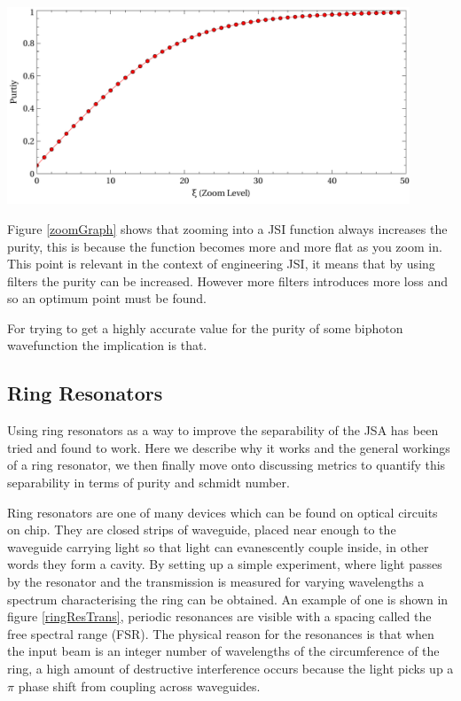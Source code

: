 \begingroup
\centering
    \includegraphics[width=12cm]{res/theory/zoomGraph.pdf}
 \label{zoomGraph}
\endgroup

Figure \ref{zoomGraph} shows that zooming into a JSI function always increases the purity, this is because the function becomes more and more flat as you zoom in. This point is relevant in the context of engineering JSI, it means that by using filters the purity can be increased. However more filters introduces more loss and so an optimum point must be found.

For trying to get a highly accurate value for the purity of some biphoton wavefunction the implication is that. 

\subsection{Ring Resonators} \label{resSect}
Using ring resonators as a way to improve the separability of the JSA has been tried and found to work. Here we describe why it works and the general workings of a ring resonator, we then finally move onto discussing metrics to quantify this separability in terms of purity and schmidt number.


Ring resonators are one of many devices which can be found on optical circuits on chip. They are closed strips of waveguide, placed near enough to the waveguide carrying light so that light can evanescently couple inside, in other words they form a cavity. By setting up a simple experiment, where light passes by the resonator and the transmission is measured for varying wavelengths a spectrum characterising the ring can be obtained. An example of one is shown in figure \ref{ringResTrans}, periodic resonances are visible with a spacing called the free spectral range (FSR). The physical reason for the resonances is that when the input beam is an integer number of wavelengths of the circumference of the ring, a high amount of destructive interference occurs because the light picks up a $\pi$ phase shift from coupling across waveguides.

